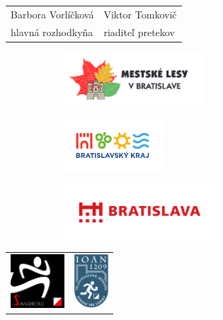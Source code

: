 \documentclass[a4paper,12pt]{article}
\begin{document}
\begin{center}
\begin{tabular}{ >{\centering}m{ } >{\centering}m{ } }
Barbora Vorlíčková & Viktor Tomkovič \tabularnewline
hlavná rozhodkyňa & riaditeľ pretekov
\end{tabular}
\end{center}

\begin{figure}[h!]
\centering
\begin{subfigure}{0.30\textwidth}
\centering
\includegraphics[height=2.0cm]{logo_lesyBA.png}
\end{subfigure}
\begin{subfigure}{0.30\textwidth}
\centering
\includegraphics[height=2.0cm]{logo_BSK.pdf}
\end{subfigure}
\begin{subfigure}{0.30\textwidth}
\centering
\includegraphics[height=2.0cm]{logo_BA.pdf}
\end{subfigure}
\end{figure}

	\begin{tabular}[t]{p{}p{}}
		\centering \includegraphics[height=2.0cm]{logo_Sandberg.png} &
		\centering \includegraphics[height=2.0cm]{logo_Ioan.png}
	\end{tabular}
\end{document}
